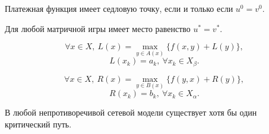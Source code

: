 \begin{theorem}
  Платежная функция имеет седловую точку, если и только если $u^0 = v^0$.
\end{theorem}

\begin{theorem}[О минимаксе]
  Для любой матричной игры имеет место равенство $u^* = v^*$.
\end{theorem}

\begin{theorem}[УБ "назад"]
	\[
		\forall x \in X, \ L(x) = \underset{y\in A(x)}{\max} \big\{f(x,y) + L(y)\big\},
	\]
	\[
		L(x_k) = a_k, \ \forall x_k \in X_{\beta } .
	\]
\end{theorem}

\begin{theorem}[УБ "вперед"]
	\[
		\forall x \in X, \ R(x) = \underset{y\in B(x)}{\max} \big\{f(y,x) + R(y)\big\},
	\]
	\[
		R(x_k) = b_k, \ \forall x_k \in X_{\alpha } .
	\]
\end{theorem}

\begin{theorem}
	В любой непротиворечивой сетевой модели существует хотя бы один критический путь.
\end{theorem}
